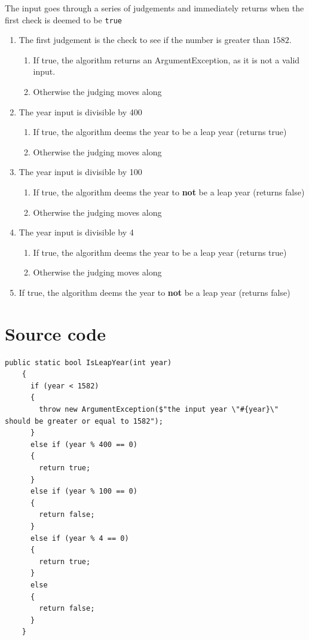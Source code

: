 \documentclass[12pt,letterpaper]{article}
\begin{document}
The input goes through a series of judgements and immediately returns when the first check is deemed to be \lstinline{true}
\begin{enumerate}
    \item The first judgement is the check to see if the number is greater than $1582$.
          \begin{enumerate}
              \item If true, the algorithm returns an ArgumentException, as it is not a valid input.
              \item Otherwise the judging moves along
          \end{enumerate}
    \item The year input is divisible by 400
          \begin{enumerate}
              \item If true, the algorithm deems the year to be a leap year (returns true)
              \item Otherwise the judging moves along
          \end{enumerate}
    \item The year input is divisible by 100
          \begin{enumerate}
              \item If true, the algorithm deems the year to \textbf{not} be a leap year (returns false)
              \item Otherwise the judging moves along
          \end{enumerate}
    \item The year input is divisible by 4
          \begin{enumerate}
              \item If true, the algorithm deems the year to be a leap year (returns true)
              \item Otherwise the judging moves along
          \end{enumerate}
    \item If true, the algorithm deems the year to \textbf{not} be a leap year (returns false)
\end{enumerate}





\pagebreak
\section{Source code}
\begin{lstlisting}[breaklines=true] 
  public static bool IsLeapYear(int year)
    {
      if (year < 1582)
      {
        throw new ArgumentException($"the input year \"#{year}\" should be greater or equal to 1582");
      }
      else if (year % 400 == 0)
      {
        return true;
      } 
      else if (year % 100 == 0)
      {
        return false;
      } 
      else if (year % 4 == 0)
      {
        return true;
      } 
      else
      {
        return false;
      }
    }
\end{lstlisting}
\end{document}
